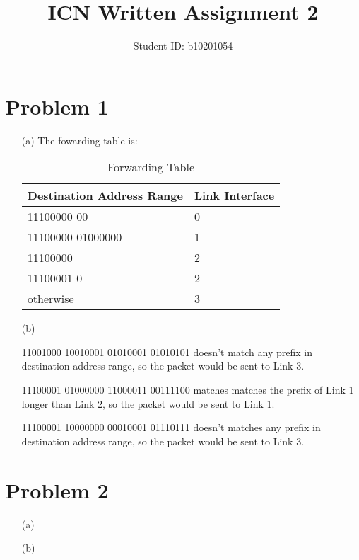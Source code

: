 \documentclass[12pt,a4paper]{article}
\title{ICN Written Assignment 2}
\author{Student ID: b10201054}
\begin{document}
\maketitle

\section*{Problem 1}

\begin{enumerate}
    \item [(a)] 
        The fowarding table is:
        \begin{table}[!ht]
            \centering
            \begin{tabular}{|l|l|}
            \hline
                Destination Address Range & Link Interface \\ \hline
                11100000 00 & 0 \\ \hline
                11100000 01000000 & 1 \\ \hline
                11100000  & 2 \\ \hline
                11100001 0 & 2 \\ \hline
                otherwise & 3 \\ \hline
            \end{tabular}
            \caption{Forwarding Table}
        \end{table}
        
    \item[(b)]
        
        11001000 10010001 01010001 01010101 doesn't match any prefix in destination address range, so the packet would be sent to Link 3.

        11100001 01000000 11000011 00111100 matches matches the prefix of Link 1 longer than Link 2, so the packet would be sent to Link 1.

        11100001 10000000 00010001 01110111 doesn't matches any prefix in destination address range, so the packet would be sent to Link 3.
        
\end{enumerate}

\section*{Problem 2}    

\begin{enumerate}
    \item [(a)] 

    \item[(b)]
    

\end{enumerate}
\end{document}
